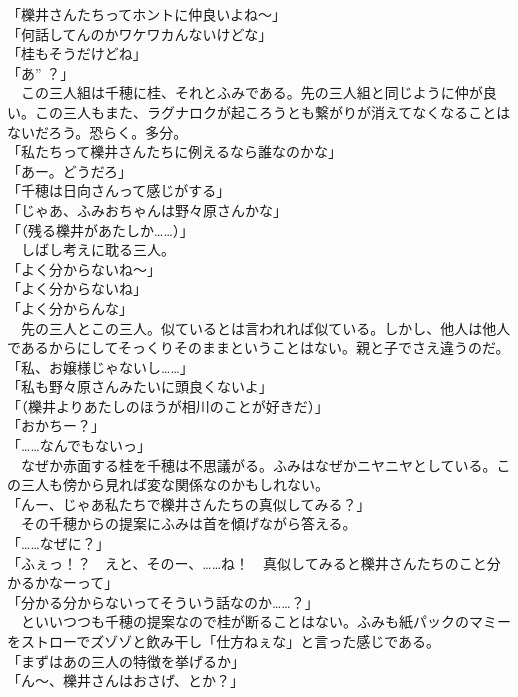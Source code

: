 「櫟井さんたちってホントに仲良いよね～」\\
「何話してんのかワケワカんないけどな」\\
「桂もそうだけどね」\\
「あ” ？」\\
　この三人組は千穂に桂、それとふみである。先の三人組と同じように仲が良い。この三人もまた、ラグナロクが起ころうとも繋がりが消えてなくなることはないだろう。恐らく。多分。\\
「私たちって櫟井さんたちに例えるなら誰なのかな」\\
「あー。どうだろ」\\
「千穂は日向さんって感じがする」\\
「じゃあ、ふみおちゃんは野々原さんかな」\\
「（残る櫟井があたしか……）」\\
　しばし考えに耽る三人。\\
「よく分からないね～」\\
「よく分からないね」\\
「よく分からんな」\\
　先の三人とこの三人。似ているとは言われれば似ている。しかし、他人は他人であるからにしてそっくりそのままということはない。親と子でさえ違うのだ。\\
「私、お嬢様じゃないし……」\\
「私も野々原さんみたいに頭良くないよ」\\
「（櫟井よりあたしのほうが相川のことが好きだ）」\\
「おかちー？」\\
「……なんでもないっ」\\
　なぜか赤面する桂を千穂は不思議がる。ふみはなぜかニヤニヤとしている。この三人も傍から見れば変な関係なのかもしれない。\\
「んー、じゃあ私たちで櫟井さんたちの真似してみる？」\\
　その千穂からの提案にふみは首を傾げながら答える。\\
「……なぜに？」\\
「ふぇっ！？　えと、そのー、……ね！　真似してみると櫟井さんたちのこと分かるかなーって」\\
「分かる分からないってそういう話なのか……？」\\
　といいつつも千穂の提案なので桂が断ることはない。ふみも紙パックのマミーをストローでズゾゾと飲み干し「仕方ねぇな」と言った感じである。\\
「まずはあの三人の特徴を挙げるか」\\
「ん～、櫟井さんはおさげ、とか？」\\
